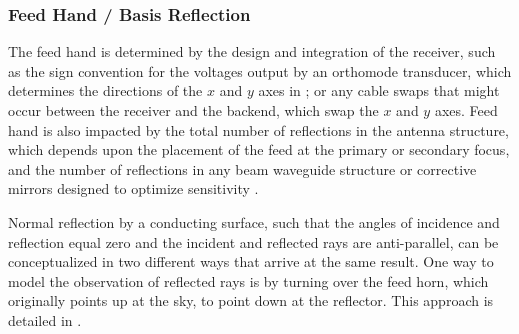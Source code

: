 \subsubsection{Feed Hand / Basis Reflection}
\label{sec:feed_hand}

The feed hand is determined by the design and integration of the receiver, such as the sign convention for the voltages
output by an orthomode transducer, which determines the directions of the $x$ and $y$ axes in ; or any cable swaps that might occur between the receiver and the backend, which swap the $x$ and $y$ axes.
%
Feed hand is also impacted by the total number of reflections in the antenna structure, which depends upon the placement of the feed at the primary or secondary focus, and the number of reflections in any beam waveguide structure \citep[e.g.,][]{gaa+04,pnw+15} or corrective mirrors designed to optimize sensitivity \citep[e.g.,][]{kbh94,gj97}. 



%
%
%
%

Normal reflection by a conducting surface, such
that the angles of incidence and reflection equal zero 
and the incident and reflected rays are anti-parallel, 
can be conceptualized in two different ways that arrive at the same result.
%
One way to model the observation of reflected rays is by turning over the feed horn, which originally points up at the sky, to point down at the reflector.  
%
This approach is detailed in .

